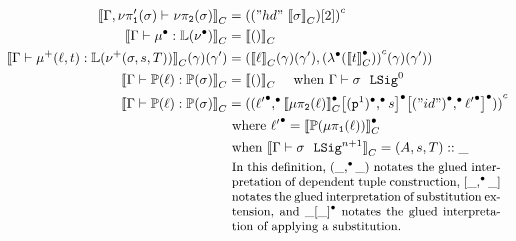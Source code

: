 \begin{align*}
  \denotesC{\goodType{\Gm, \lsigprojT{\lsig}}{\lsigproj{2}{\lsig}}{}} &= \Gmodel{("hd"~\denotesC{\lsig})[2]}\\
  \denotesC{\goodTerm{\Gm}{\LkgEmp}{\TyLkg{\LSigEmp}}} &= \denotesC{\unit} \\
  \denotesC{\goodTerm{\Gm}{\LkgAdd{\lkg}{t}}{\TyLkg{\LSigAdd{\lsig}{s}{T}}}}(\gm)(\gm') &= (\denotesC{\lkg}(\gm)(\gm') , \Gmodel{\Glam{\denotesCC{t}}}(\gm)(\gm')) \\
  \denotesC{\goodTerm{\Gm}{\Tkg{\lkg}}{\TyTkg{\lsig}}} &= \denotesC{\unit}
  \quad \text{ when \goodSig{\Gm}{\lsig}{0}} \\
  \denotesC{\goodTerm{\Gm}{\Tkg{\lkg}}{\TyTkg{\lsig}}} &= \Gmodel{\Gpair{\Glued{\ell'}}{\Gsub{\Gsub{\denotesCC{\lkgproj{2}{\lkg}}}{\GSubstExt{{\GSubstWeak{1}}}{s}}}{\GSubstExt{\Glued{("id")}}{ \Glued{\ell'} }}}}
  \\ &\text{ where } \Glued{\ell'} = \denotesCC{\Tkg{\lkgproj{1}{\lkg}}} 
  \\ &\text{ when } \denotesC{\goodSig{\Gm}{\lsig}{n+1}} = (A, s, T)::\_
  \\ &{~\begin{minipage}{.58\textwidth}\small
    In this definition, $\Gpair{\_}{\_}$ notates the glued interpretation of
    dependent tuple construction, $[\GSubstExt{\_}{\_}]$ notates the glued
    interpretation of substitution extension, and $\Gsub{\_}{\_}$ notates the
    glued interpretation of applying a substitution.
  \end{minipage}}
\end{align*}





